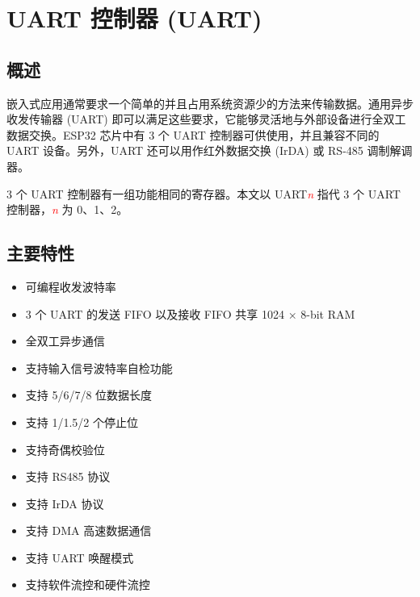 \documentclass[main\_\_CN.tex]{subfiles}
\begin{document}
\setchineseformatting


\ifglobal
\else
    \listoftodos
    {\let\clearpage\relax \listofdonetodos}
    \tableofcontents
\fi



\hypertarget{uart}{}
\chapter{UART 控制器 (UART)}
\label{mod:uart}


\section{概述}

嵌入式应用通常要求一个简单的并且占用系统资源少的方法来传输数据。通用异步收发传输器 (UART) 即可以满足这些要求，它能够灵活地与外部设备进行全双工数据交换。ESP32 芯片中有 3 个 UART 控制器可供使用，并且兼容不同的 UART 设备。另外，UART 还可以用作红外数据交换 (IrDA) 或 RS-485 调制解调器。

3 个 UART 控制器有一组功能相同的寄存器。本文以 UART\textcolor{red}{\it{n}} 指代 3 个 UART 控制器，\textcolor{red}{\it{n}} 为 0、1、2。

\section{主要特性}

\begin{itemize}
    \item 可编程收发波特率
    \item 3 个 UART 的发送 FIFO 以及接收 FIFO 共享 1024 × 8-bit RAM
    \item 全双工异步通信
    \item 支持输入信号波特率自检功能
    \item 支持 5/6/7/8 位数据长度
    \item 支持 1/1.5/2 个停止位
    \item 支持奇偶校验位
    \item 支持 RS485 协议
    \item 支持 IrDA 协议
    \item 支持 DMA 高速数据通信
    \item 支持 UART 唤醒模式
    \item 支持软件流控和硬件流控
\end{itemize}
\end{document}
